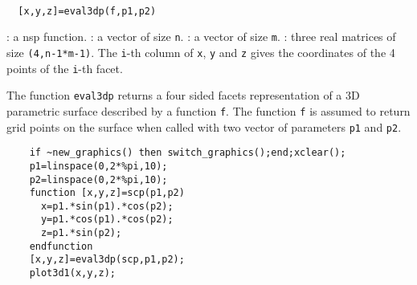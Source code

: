 \begin{mandesc}
  \\
\end{mandesc}
\begin{calling_sequence}
\begin{verbatim}
  [x,y,z]=eval3dp(f,p1,p2)
\end{verbatim}
\end{calling_sequence}
\begin{parameters}
  \begin{varlist}
    :  a nsp function.
    : a vector of size \verb!n!.
    : a vector of size \verb!m!.
    : three real matrices of size \verb!(4,n-1*m-1)!. The \verb!i!-th column
    of \verb!x!, \verb!y! and \verb!z! gives the coordinates of the 4 points of the
    \verb!i!-th facet.
  \end{varlist}
\end{parameters}

\begin{mandescription}
  The function \verb!eval3dp! returns a four sided facets representation of a
  3D parametric surface described by a function \verb!f!. The function \verb!f!
  is assumed to return grid points on the surface when called with two vector of
  parameters \verb!p1! and \verb!p2!.
\end{mandescription}

\begin{examples}
  \begin{Verbatim}
    if ~new_graphics() then switch_graphics();end;xclear();
    p1=linspace(0,2*%pi,10);
    p2=linspace(0,2*%pi,10);
    function [x,y,z]=scp(p1,p2)
      x=p1.*sin(p1).*cos(p2);
      y=p1.*cos(p1).*cos(p2);
      z=p1.*sin(p2);
    endfunction
    [x,y,z]=eval3dp(scp,p1,p2);
    plot3d1(x,y,z);
  \end{Verbatim}
\end{examples}

\begin{manseealso}
   
\end{manseealso}
